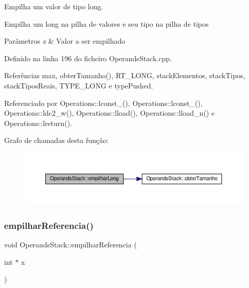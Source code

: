Empilha um valor de tipo long. 

Empilha um long na pilha de valores e seu tipo na pilha de tipos


\begin{DoxyParams}{Parâmetros}
{\em x} & Valor a ser empilhado \\
\hline
\end{DoxyParams}


Definido na linha 196 do ficheiro Operands\+Stack.\+cpp.



Referências max, obter\+Tamanho(), R\+T\+\_\+\+L\+O\+NG, stack\+Elementos, stack\+Tipos, stack\+Tipos\+Reais, T\+Y\+P\+E\+\_\+\+L\+O\+NG e type\+Pushed.



Referenciado por Operations\+::lconst\+\_(), Operations\+::lconst\+\_(), Operations\+::ldc2\+\_\+w(), Operations\+::lload(), Operations\+::lload\+\_\+n() e Operations\+::lreturn().

Grafo de chamadas desta função\+:
\nopagebreak
\begin{figure}[H]
\begin{center}
\leavevmode
\includegraphics[width=350pt]{classOperandsStack_a927ca84358d7e0f45f74d122f9a500d2_cgraph}
\end{center}
\end{figure}
\mbox{\label{classOperandsStack_a47af7d965172984b9cc5c61d8c4c1ce3}} 
\subsubsection{\texorpdfstring{empilhar\+Referencia()}{empilharReferencia()}}
{\footnotesize\ttfamily void Operands\+Stack\+::empilhar\+Referencia (\begin{DoxyParamCaption}\item[{int $\ast$}]{x }\end{DoxyParamCaption})}



